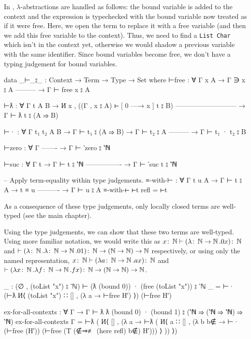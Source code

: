 In \citet[chapter~Lambda]{wadler_programming_2022}, $\lambda$-abstractions are handled as follows:
the bound variable is added to the context and the expression is typechecked with the bound variable
now treated as if it were free. Here, we open the term to replace it with a free variable (and then
we add this free variable to the context). Thus, we need to find a \texttt{List Char} which isn't in
the context yet, otherwise we would shadow a previous variable with the same identifier. Since bound
variables become free, we don't have a typing judgement for bound variables.
\begin{code}
  data _⊢_⦂_ : Context → Term → Type → Set where
    ⊢free : ∀ {Γ x A}
      → Γ ∋ x ⦂ A
        ---------
      → Γ ⊢ free x ⦂ A

    ⊢ƛ : ∀ {Γ t A B}
      → И x , ((Γ , x ⦂ A) ⊢ [ 0 —→ x ] t ⦂ B)
        ---------------------------
      → Γ ⊢ ƛ t ⦂ (A ⇒ B)

    ⊢· : ∀ {Γ t₁ t₂ A B}
      → Γ ⊢ t₁ ⦂ (A ⇒ B)
      → Γ ⊢ t₂ ⦂ A
        ---------
      → Γ ⊢ t₁ · t₂ ⦂ B

    ⊢zero : ∀ {Γ}
        -------
      → Γ ⊢ ‵zero ⦂ ‵ℕ

    ⊢suc : ∀ {Γ t}
      → Γ ⊢ t ⦂ ‵ℕ
        ----------------
      → Γ ⊢ ‵suc t ⦂ ‵ℕ

  -- Apply term-equality within type judgements.
  ≡-with-⊢ : ∀ {Γ t u A}
    → Γ ⊢ t ⦂ A
    → t ≡ u
      ----------
    → Γ ⊢ u ⦂ A
  ≡-with-⊢ ⊢t refl = ⊢t
\end{code}

As a consequence of these type judgements, only locally closed terms are well-typed (see the main
chapter).

Using the type judgements, we can show that these two terms are well-typed. Using more familiar
notation, we would write this as $x \colon \operatorname{\mathbb{N}} \vdash (\lambda \colon \operatorname{\mathbb{N}} \to \operatorname{\mathbb{N}}. 0x) \colon \operatorname{\mathbb{N}}$
and $\vdash (\lambda \colon \operatorname{\mathbb{N}}. \lambda \colon \operatorname{\mathbb{N}} \to \operatorname{\mathbb{N}}. 01) \colon \operatorname{\mathbb{N}} \to (\operatorname{\mathbb{N}}
\to \operatorname{\mathbb{N}}) \to \operatorname{\mathbb{N}}$ respectively, or using only the named representation, $x \colon \operatorname{\mathbb{N}} \vdash
(\lambda a \colon \operatorname{\mathbb{N}} \to \operatorname{\mathbb{N}}. ax) \colon \operatorname{\mathbb{N}}$ and $\vdash (\lambda x \colon \operatorname{\mathbb{N}}. \lambda
f \colon \operatorname{\mathbb{N}} \to \operatorname{\mathbb{N}}. fx) \colon \operatorname{\mathbb{N}} \to (\operatorname{\mathbb{N}} \to \operatorname{\mathbb{N}}) \to \operatorname{\mathbb{N}}$.
\begin{code}
  _ : (∅ , (toList "x") ⦂ ‵ℕ) ⊢ (ƛ (bound 0)) · (free (toList "x")) ⦂ ‵ℕ
  _ = ⊢· (⊢ƛ И⟨ (toList "x") ∷ [] , (λ a → ⊢free H′) ⟩) (⊢free H′)

  ex-for-all-contexts : ∀ {Γ} → Γ ⊢ ƛ ƛ (bound 0) · (bound 1) ⦂ (‵ℕ ⇒ (‵ℕ ⇒ ‵ℕ) ⇒ ‵ℕ)
  ex-for-all-contexts {Γ} = ⊢ƛ (
    И⟨ [] , (λ a → ⊢ƛ (
      И⟨ a ∷ []
      , (λ b {b∉} → ⊢· (⊢free (H′)) (⊢free (T (∉⇒≢ (here refl) b∉) H′))) ⟩ )) ⟩)
\end{code}

